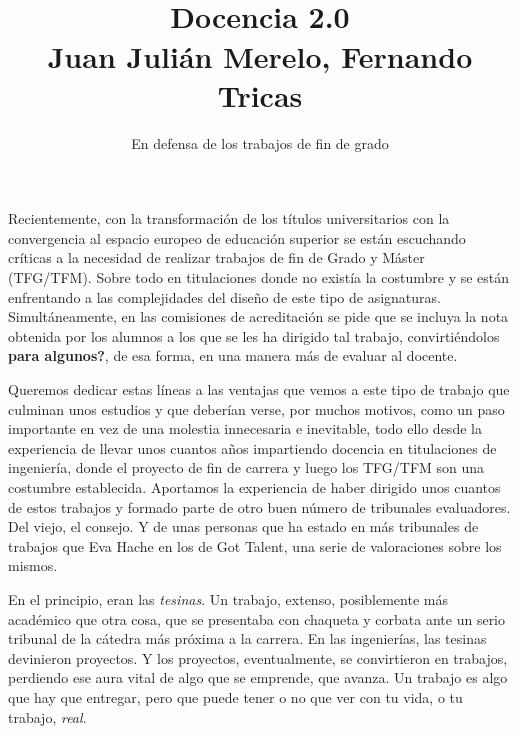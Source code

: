 \documentclass[twoside,10pt]{article}
\title{\ \\ Docencia 2.0\\ \large Juan Juli\'an Merelo, Fernando Tricas}
\author{\LARGE En defensa de los trabajos de fin de grado}
\date{}
\begin{document}
\addtocounter{page}{2}

\maketitle
\vspace*{-2ex}

\begin{multicols}{2}
 
Recientemente, con la transformaci\'on de los t\'itulos universitarios con
la convergencia al espacio europeo de educaci\'on superior se est\'an
escuchando cr\'iticas a la necesidad de realizar trabajos de fin de
Grado y M\'aster (TFG/TFM). Sobre todo en titulaciones donde no exist\'ia la
costumbre y se est\'an enfrentando a las complejidades del dise\~no de este
tipo de asignaturas. Simult\'aneamente, en las comisiones de acreditaci\'on se
pide que se incluya la nota obtenida por los alumnos a los que se les ha
dirigido tal trabajo, convirti\'endolos {\bf para algunos?}, de esa forma, en
una manera m\'as de evaluar al docente. 

Queremos dedicar estas l\'ineas a las ventajas que vemos a este tipo de
trabajo que culminan unos estudios y que deber\'ian verse, por muchos
motivos, como un paso importante en vez de una molestia innecesaria
e inevitable, todo ello desde la experiencia de llevar unos cuantos
a\~nos impartiendo docencia en titulaciones de ingenier\'ia, donde el
proyecto de fin de carrera y luego los TFG/TFM son una
costumbre establecida. Aportamos la experiencia de haber dirigido unos cuantos
de estos trabajos y formado parte de otro buen n\'umero de tribunales
evaluadores. Del viejo, el consejo. Y de unas personas que ha estado en m\'as
tribunales de trabajos que Eva Hache en los de Got Talent, una serie de
valoraciones sobre los mismos. 

En el principio, eran las {\em tesinas}. Un trabajo, extenso,
posiblemente m\'as acad\'emico que otra cosa, que se presentaba con
chaqueta y corbata ante un serio tribunal de la c\'atedra m\'as pr\'oxima a
la carrera. En las ingenier\'ias, las tesinas devinieron
proyectos. %
 Y los proyectos, eventualmente, se convirtieron en trabajos,
 perdiendo ese aura vital de algo que se emprende, que avanza. Un
 trabajo es algo que hay que entregar, pero que puede tener o no que
 ver con tu vida, o tu trabajo, {\em real}. 


\end{multicols}
\end{document}
